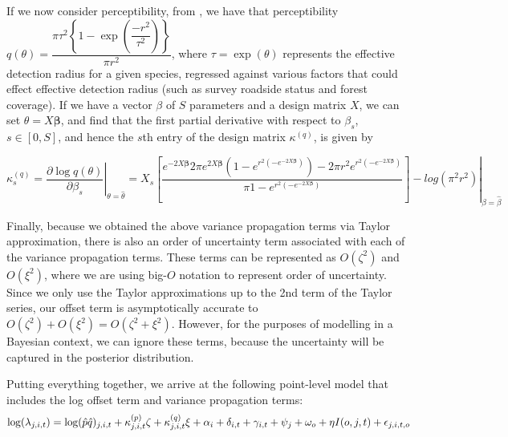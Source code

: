 \par If we now consider perceptibility, from \citet{solymos_calibrating_2013}, we have that perceptibility $q(\theta) = \dfrac{\pi \tau^2 \left\{1 - \exp\left(\dfrac{-r^2}{\tau^2}\right)\right\}}{\pi r^2}$, where $\tau = \exp(\theta)$ represents the effective detection radius for a given species, regressed against various factors that could effect effective detection radius (such as survey roadside status and forest coverage). 
If we have a vector {\boldmath$\beta$} of $S$ parameters and a design matrix $X$, we can set $\theta = X\boldsymbol{\beta}$, and find that the first partial derivative with respect to $\beta_s$, $s \in \left[0, S\right]$, and hence the $s$th entry of the design matrix $\kappa^{(q)}$, is given by

\begin{equation*}\label{kappa_q}
	\kappa_{s}^{(q)} = \left. \dfrac{\partial \log q(\theta)}{\partial \beta_s} \right\vert_{\theta = \hat{\theta}}= \left. X_s \left[\dfrac{{e^{-2X\boldsymbol{\beta}}} {2 \pi  e^{2X\boldsymbol{\beta}}} {\left(1 - e^{r^2 \left(-e^{-2X\boldsymbol{\beta}}\right)}\right)} - {2\pi r^2} {e^{r^2 \left(-e^{-2X\boldsymbol{\beta}}\right)}}}             {\pi {1-e^{r^2 \left(-e^{-2X\boldsymbol{\beta}}\right)}}}\right]  - log(\pi^2r^2) \right\vert_{\beta = \hat{\beta}}
\end{equation*}

\par Finally, because we obtained the above variance propagation terms via Taylor approximation, there is also an order of uncertainty term associated with each of the variance propagation terms.
These terms can be represented as $O(\zeta^2)$ and $O(\xi^2)$, where we are using big-$O$ notation to represent order of uncertainty. 
Since we only use the Taylor approximations up to the 2nd term of the Taylor series, our offset term is asymptotically accurate to $O(\zeta^2) + O(\xi^2) = O(\zeta^2 + \xi^2)$.
However, for the purposes of modelling in a Bayesian context, we can ignore these terms, because the uncertainty will be captured in the posterior distribution.

Putting everything together, we arrive at the following point-level model that includes the log offset term and variance propagation terms:
\begin{equation}\label{bbs_varprop}
	\log(\lambda_{j,i,t}) = \log(\hat{p} \hat{q})_{j,i,t} + \kappa_{j,i,t}^{(p)}\zeta + \kappa_{j,i,t}^{(q)}\xi + \alpha_i + \delta_{i,t} + \gamma_{i,t} + \psi_j + \omega_o + \eta I(o,j,t) + \epsilon_{j,i,t,o} \\
\end{equation}

